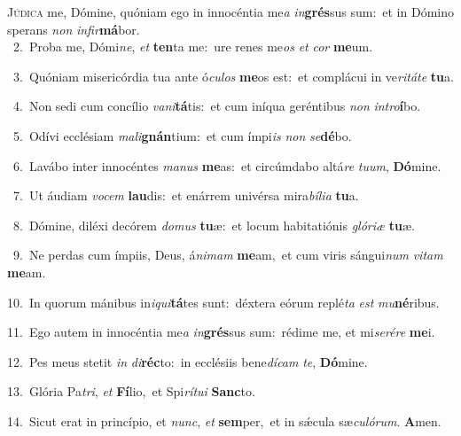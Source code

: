 \lettrine{\initial\textcolor{\initialcolor}{J}}{údica} me, Dómine, quóniam ego in innocéntia me\textit{a} \textit{in}\-\textbf{grés}sus sum:~\star et in Dómino sperans \textit{non} \textit{in}\-\textit{fir}\textbf{má}bor.\\
{\numbfont\textcolor{\numbcolor}{~2.}}~Proba me, Dómi\-\textit{ne}\-, \textit{et} \textbf{ten}\-ta me:~\star ure renes me\textit{os} \textit{et} \textit{cor} \textbf{me}\-um.\par
{\numbfont\textcolor{\numbcolor}{~3.}}~Quóniam misericórdia tua ante ó\-\textit{cu}\-\textit{los} \textbf{me}\-os est:~\star et complácui in ve\-\textit{ri}\-\textit{tá}\textit{te} \textbf{tu}\-a.\par
{\numbfont\textcolor{\numbcolor}{~4.}}~Non sedi cum concílio \textit{va}\-\textit{ni}\textbf{tá}tis:~\star et cum iníqua geréntibus \textit{non} \textit{in}\-\textit{tro}\textbf{í}bo.\par
{\numbfont\textcolor{\numbcolor}{~5.}}~Odívi ecclésiam \textit{ma}\-\textit{li}\textbf{gnán}tium:~\star et cum ímpi\textit{is} \textit{non} \textit{se}\-\textbf{dé}bo.\par
{\numbfont\textcolor{\numbcolor}{~6.}}~Lavábo inter innocéntes \textit{ma}\-\textit{nus} \textbf{me}\-as:~\star et circúmdabo altá\textit{re} \textit{tu}\-\textit{um}, \textbf{Dó}\-mine.\par
{\numbfont\textcolor{\numbcolor}{~7.}}~Ut áudiam \textit{vo}\-\textit{cem} \textbf{lau}\-dis:~\star et enárrem univérsa mira\-\textit{bí}\-\textit{li}\textit{a} \textbf{tu}\-a.\par
{\numbfont\textcolor{\numbcolor}{~8.}}~Dómine, diléxi decórem \textit{do}\-\textit{mus} \textbf{tu}\-æ:~\star et locum habitatiónis \textit{gló}\-\textit{ri}\textit{æ} \textbf{tu}\-æ.\par
{\numbfont\textcolor{\numbcolor}{~9.}}~Ne perdas cum ímpiis, Deus, á\-\textit{ni}\-\textit{mam} \textbf{me}\-am,~\star et cum viris sángui\textit{num} \textit{vi}\-\textit{tam} \textbf{me}\-am.\par
{\numbfont\textcolor{\numbcolor}{10.}}~In quorum mánibus in\-\textit{i}\-\textit{qui}\textbf{tá}tes sunt:~\star déxtera eórum replé\textit{ta} \textit{est} \textit{mu}\-\textbf{né}ribus.\par
{\numbfont\textcolor{\numbcolor}{11.}}~Ego autem in innocéntia me\textit{a} \textit{in}\-\textbf{grés}sus sum:~\star rédime me, et mi\-\textit{se}\-\textit{ré}\textit{re} \textbf{me}\-i.\par
{\numbfont\textcolor{\numbcolor}{12.}}~Pes meus stetit \textit{in} \textit{di}\-\textbf{réc}to:~\star in ecclésiis bene\-\textit{dí}\-\textit{cam} \textit{te}\-, \textbf{Dó}\-mine.\par
{\numbfont\textcolor{\numbcolor}{13.}}~Glória Pa\-\textit{tri}\-, \textit{et} \textbf{Fí}\-lio,~\star et Spi\-\textit{rí}\-\textit{tu}\textit{i} \textbf{Sanc}\-to.\par
{\numbfont\textcolor{\numbcolor}{14.}}~Sicut erat in princípio, et \textit{nunc}\-, \textit{et} \textbf{sem}\-per,~\star et in sǽcula sæ\-\textit{cu}\-\textit{ló}\textit{rum}. \textbf{A}\-men.\par
